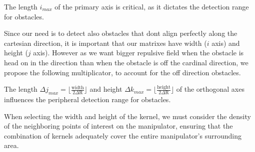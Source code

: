 \documentclass[letterpaper, 10 pt, conference]{ieeeconf}  %
\begin{document}
The length $i_{max}$ of the primary axis is critical, as it dictates the detection range for obstacles. 



Since our need is to detect also obstacles that dont align perfectly along the cartesian direction, it is important that our matrixes have width ($i$ axis) and height ($j$ axis). However as we want bigger repulsive field when the obstacle is head on in the direction than when the obstacle is off the cardinal direction, we propose the following multiplicator, to account for the off direction obstacles.

The length $\Delta j_{max} = \lfloor \frac{\mathrm{width}}{2 \Delta \mathrm{R}} \rfloor$ and height $\Delta k_{max} = \lfloor \frac{\mathrm{height}}{2 \Delta \mathrm{R}} \rfloor$ of the orthogonal axes influences the peripheral detection range for obstacles. 


When selecting the width and height of the kernel, we must consider the density of the neighboring points of interest on the manipulator, ensuring that the combination of kernels adequately cover the entire manipulator's surrounding area. 

%
\end{document}

